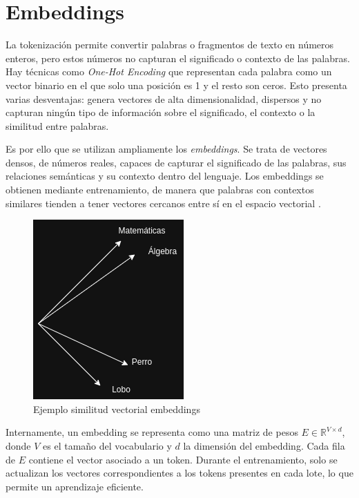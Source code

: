 \documentclass[11pt]{book}
\begin{document}
\section{Embeddings}
La tokenización permite convertir palabras o fragmentos de texto en números enteros, pero estos números no capturan el significado o contexto de las palabras. Hay técnicas como  \textit{One-Hot Encoding} que representan cada palabra como un vector binario en el que solo una posición es 1 y el resto son ceros. Esto presenta varias desventajas: genera vectores de alta dimensionalidad, dispersos y no capturan ningún tipo de información sobre el significado, el contexto o la similitud entre palabras.

Es por ello que se utilizan ampliamente los \textit{embeddings}. Se trata de vectores densos, de números reales, capaces de capturar el significado de las palabras, sus relaciones semánticas y su contexto dentro del lenguaje. Los embeddings se obtienen mediante entrenamiento, de manera que palabras con contextos similares tienden a tener vectores cercanos entre sí en el espacio vectorial \parencite{geeksforgeeks_embedding}.

\begin{figure}[h]
    \centering
    \includegraphics[width=0.5\linewidth]{img/ejemplo_embedding.png}
    \caption{Ejemplo similitud vectorial embeddings}
    \label{fig:placeholder6}
\end{figure}

Internamente, un embedding se representa como una matriz de pesos $E \in \mathbb{R}^{V \times d}$, donde $V$ es el tamaño del vocabulario y $d$ la dimensión del embedding. Cada fila de $E$ contiene el vector asociado a un token. Durante el entrenamiento, solo se actualizan los vectores correspondientes a los tokens presentes en cada lote, lo que permite un aprendizaje eficiente.
\end{document}
